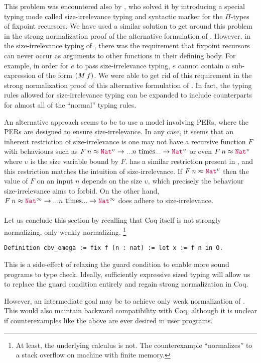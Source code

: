 This problem was encountered also by \citet{barras-thesis}, who solved
it by introducing a special typing mode called size-irrelevance typing
and syntactic marker for the $\Pi$-types of fixpoint recursors.
%
We have used a similar solution to get around this problem in the
strong normalization proof of the alternative formulation of \lang.
%
However, in the size-irrelevance typing of \citet{barras-thesis},
there was the requirement that fixpoint recursors can never occur as
arguments to other functions in their defining body.
%
For example, in order for $e$ to pass size-irrelevance typing, $e$
cannot contain a sub-expression of the form $(\app{M}{f})$.
%
We were able to get rid of this requirement in the strong
normalization proof of this alternative formulation of \lang.
%
In fact, the typing rules allowed for size-irrelevance typing can be
expanded to include counterparts for almost all of the ``normal''
typing rules.

An alternative approach seems to be to use a model involving PERs,
where the PERs are designed to ensure size-irrelevance.
%
In any case, it seems that an inherent restriction of size-irrelevance
is one may not have a recursive function $F$ with behaviours such as
$\app{F}{n} \approx \Nat^\upsilon \to ...n\text{ times}... \to
\Nat^\upsilon$ or even $\app{F}{n} \approx \Nat^\upsilon$ where
$\upsilon$ is the size variable bound by $F$.
%
\citet{cic-hat-minus} has a similar restriction present in
\CIChatminus, and this restriction matches the intuition of
size-irrelevance.
%
If $\app{F}{n} \approx \Nat^\upsilon$ then the value of $F$ on an
input $n$ depends on the size $\upsilon$, which precisely the
behaviour size-irrelevance aims to forbid.
%
On the other hand, $\app{F}{n} \approx \Nat^\infty \to
...n\text{ times}...\to\Nat^\infty$ does adhere to size-irrelevance.

\paragraph*{}
Let us conclude this section by recalling that Coq itself is not
strongly normalizing, only weakly normalizing.
%
\footnote{At least, the
  underlying calculus is not. The counterexample ``normalizes'' to a
  stack overflow on machine with finite memory.}

\begin{verbatim}
Definition cbv_omega := fix f (n : nat) := let x := f n in O.
\end{verbatim}

This is a side-effect of relaxing the guard condition to enable more
sound programs to type check.
%
Ideally, sufficiently expressive sized typing will allow us to replace
the guard condition entirely and regain strong normalization in Coq.

However, an intermediate goal may be to achieve only weak
normalization of \lang.
%
This would also maintain backward compatibility with Coq, although it
is unclear if counterexamples like the above are ever desired in user
programs.


